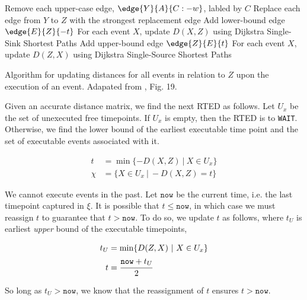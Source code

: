 \documentclass[11pt]{article}
\begin{document}
\begin{algorithm}
\SetAlgoLined
{}
\Indm
{}
\Indp
\Algorithm{}
\Indp
{} {
    Remove each upper-case edge, $\edge{Y}{A}{C:-w}$, labled by $C$\;
    Replace each edge from $Y$ to $Z$ with the strongest replacement edge\;
}
 {
    Add lower-bound edge $\edge{E}{Z}{-t}$\;
}
For each event $X$, update $D(X, Z)$ using Dijkstra Single-Sink Shortest Paths\;
 {
    Add upper-bound edge $\edge{Z}{E}{t}$\;
}
For each event $X$, update $D(Z, X)$ using Dijkstra Single-Source Shortest Paths\;
\caption{Algorithm for updating distances for all events in relation to $Z$ upon the execution of an event. Adapated from , Fig. 19.}
\label{alg:fast-ex-update}
\end{algorithm}

Given an accurate distance matrix, we find the next RTED as follows. Let \(U_{x}\) be the set of
unexecuted free timepoints. If \(U_{x}\) is empty, then the RTED is to \texttt{WAIT}. Otherwise, we find the
lower bound of the earliest executable time point and the set of executable events associated with
it.

\begin{align*}
t &= \min\{-D(X, Z)~|~X \in U_{x}\} \\
\chi &= \{X \in U_{x}~|~-D(X, Z) = t\}
\end{align*}

We cannot execute events in the past. Let \(\texttt{now}\) be the current time, i.e. the last timepoint
captured in \(\xi\). It is possible that \(t \leq \texttt{now}\), in which case we must reassign \(t\) to
guarantee that \(t > \texttt{now}\). To do so, we update \(t\) as follows, where \(t_{U}\) is earliest
\emph{upper} bound of the executable timepoints,

\begin{align*}
t_{U} &= \min\{D(Z, X)~|~X \in U_{x}\} \\
t &= \cfrac{\texttt{now} + t_{U}}{2}
\end{align*}

So long as \(t_{U} > \texttt{now}\), we know that the reassignment of \(t\) ensures \(t > \texttt{now}\).
\end{document}

